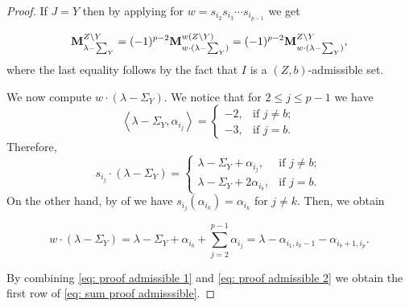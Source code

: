 \begin{proof}
    If $J=Y$ then by applying   for $w=s_{i_{2}}s_{i_{3}}\cdots s_{i_{p-1}}$ we get

    \begin{equation}\label{eq: proof admissible 1}
        \mathbf{M}_{\lambda - \sum_{Y}}^{Z\setminus Y} = (-1)^{p-2}\mathbf{M}_{w\cdot(\lambda - \sum_{Y})}^{w(Z\setminus Y)} = (-1)^{p-2}\mathbf{M}_{w\cdot(\lambda - \sum_{Y})}^{Z\setminus Y},
    \end{equation}
    where the last equality follows by the fact that $I$ is a  $(Z,b)$-admissible set. 
    
    We now compute  $w\cdot(\lambda - \Sigma_{Y})$. We notice that for $2\leq j\leq p-1$ we have
    \begin{equation}
       \left\langle \lambda - \Sigma_Y,\alpha_{i_{j}} \right\rangle  = \left\{
       \begin{array}{cc}
            -2, & \mbox{if }j\neq b; \\
            -3, & \mbox{if }j=b. 
       \end{array} \right.
    \end{equation}
    Therefore, 
    \begin{equation}
        s_{i_j}\cdot (\lambda - \textstyle\Sigma_Y) =     \left\{  \begin{array}{ll}
          \lambda - \Sigma_{Y} + \alpha_{i_j},   & \mbox{if } j\neq b; \\
         \lambda - \Sigma_{Y} + 2\alpha_{i_{b}},    & \mbox{if } j=b. 
        \end{array}  \right.
    \end{equation}
On the other hand, by  of  we have $s_{i_{j}} (\alpha_{i_{k}}) = \alpha_{i_{k}}$ for $j\neq k$. Then, we obtain 

\begin{equation}\label{eq: proof admissible 2}
\displaystyle
 w\cdot (\lambda - \Sigma_{Y}) = \lambda -\Sigma_{Y}+\alpha_{i_b} +\sum_{j=2}^{p-1} \alpha_{i_j} =   \lambda - \alpha_{i_{1},i_{b}-1} -\alpha_{i_{b} +1 , i_{p}}.    
\end{equation}

By combining \eqref{eq: proof admissible 1} and  \eqref{eq: proof admissible 2} we obtain the first row of \eqref{eq: sum proof admisssible}.



\end{proof}
